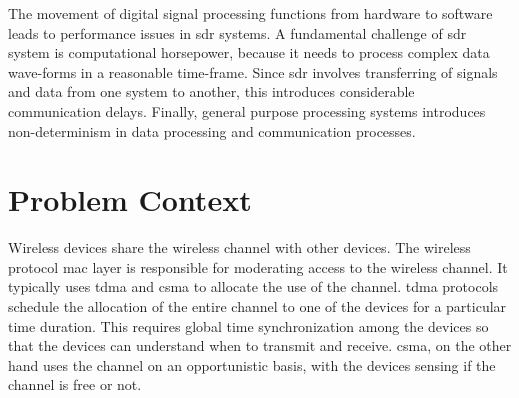 
The movement of digital signal processing functions from hardware to software leads to performance issues in \ac{sdr} systems.
A fundamental challenge of \ac{sdr} system is computational horsepower, because it needs to process complex data wave-forms in a reasonable time-frame. Since \ac{sdr} involves transferring of signals and data from one system to another, this introduces considerable communication delays. Finally, general purpose processing systems introduces non-determinism in data processing and communication processes.\\


\section{Problem Context}
Wireless devices share the wireless channel with other devices. The wireless protocol \ac{mac} layer is responsible for moderating access to the wireless channel. It typically uses \ac{tdma} and \ac{csma} to allocate the use of the channel. \ac{tdma} protocols schedule the allocation of the entire channel to one of the devices for a particular time duration. This requires global time synchronization among the devices so that the devices can understand when to transmit and receive. \ac{csma}, on the other hand uses the channel on an opportunistic basis, with the devices sensing if the channel is free or not.\\

